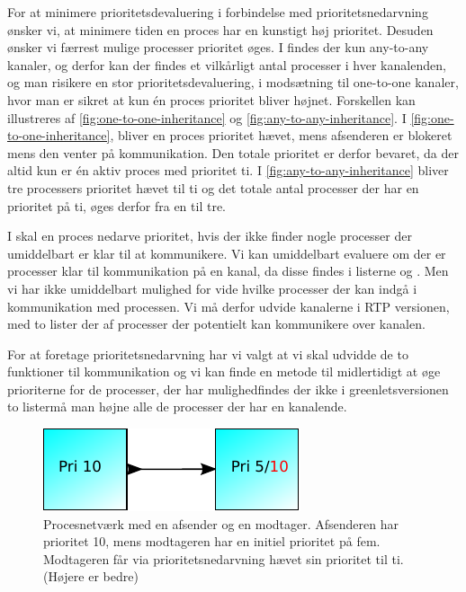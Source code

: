 For at minimere prioritetsdevaluering i forbindelse med prioritetsnedarvning  ønsker vi, at minimere tiden en proces har en kunstigt høj prioritet. Desuden ønsker vi  færrest mulige processer  prioritet øges. I \pycsp findes der kun any-to-any kanaler, og derfor kan der findes et vilkårligt antal processer i hver kanalenden, og man risikere en stor prioritetsdevaluering, i modsætning til  one-to-one kanaler, hvor man er sikret at kun én proces prioritet bliver højnet. Forskellen kan illustreres af \autoref{fig:one-to-one-inheritance} og \cref{fig:any-to-any-inheritance}. I \autoref{fig:one-to-one-inheritance}, bliver  en proces prioritet hævet, mens afsenderen er blokeret mens den venter på kommunikation. Den totale prioritet er derfor bevaret, da der altid kun er én aktiv proces med prioritet ti. I \autoref{fig:any-to-any-inheritance} bliver tre processers prioritet hævet til ti og det totale antal processer der har en prioritet på ti, øges derfor fra en til tre. 


I \pycsp skal en proces nedarve prioritet, hvis der ikke finder nogle processer der umiddelbart er klar til at kommunikere. 
Vi kan umiddelbart evaluere om der er processer klar til kommunikation på en kanal, da disse findes i listerne  og . Men vi har ikke umiddelbart mulighed for vide hvilke processer der kan indgå i kommunikation med processen. Vi må derfor udvide kanalerne i RTP versionen, med to lister der af processer der potentielt kan kommunikere over kanalen.  

For at foretage prioritetsnedarvning har vi valgt at vi skal udvidde de to funktioner til kommunikation  og 
vi kan finde en metode til midlertidigt at øge prioriterne for de processer, der har mulighedfindes der ikke i greenletsversionen to listermå man højne alle de processer der har en kanalende. 

\begin{figure}
 \begin{center}
  \includegraphics[scale=1.00]{images/one-to-one-inheritance}
\caption{Procesnetværk med en afsender og en modtager. Afsenderen har prioritet 10, mens modtageren har en initiel prioritet på fem. Modtageren  får via prioritetsnedarvning hævet sin prioritet til ti. (Højere er bedre)}
  \label{fig:one-to-one-inheritance}
  \end{center}
\end{figure}

